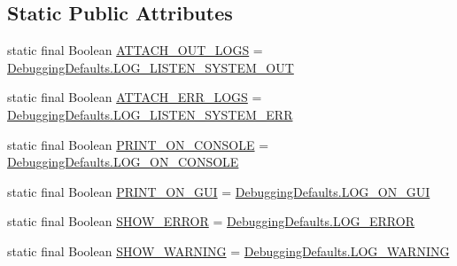 \subsection*{Static Public Attributes}
\begin{DoxyCompactItemize}
\item 
static final Boolean \hyperlink{classit_1_1emarolab_1_1cagg_1_1debugging_1_1StandaloneDebuggingText_a096b28d2f3e1c71e7f3d039559ea91a3}{A\-T\-T\-A\-C\-H\-\_\-\-O\-U\-T\-\_\-\-L\-O\-G\-S} = \hyperlink{classit_1_1emarolab_1_1cagg_1_1debugging_1_1DebuggingDefaults_a2d4710f38eb7e92c5b733f49baefd243}{Debugging\-Defaults.\-L\-O\-G\-\_\-\-L\-I\-S\-T\-E\-N\-\_\-\-S\-Y\-S\-T\-E\-M\-\_\-\-O\-U\-T}
\item 
static final Boolean \hyperlink{classit_1_1emarolab_1_1cagg_1_1debugging_1_1StandaloneDebuggingText_a3c7f740a83d97241fa0ec2964f466884}{A\-T\-T\-A\-C\-H\-\_\-\-E\-R\-R\-\_\-\-L\-O\-G\-S} = \hyperlink{classit_1_1emarolab_1_1cagg_1_1debugging_1_1DebuggingDefaults_a99a53b1245a543cd658a05b4559a8902}{Debugging\-Defaults.\-L\-O\-G\-\_\-\-L\-I\-S\-T\-E\-N\-\_\-\-S\-Y\-S\-T\-E\-M\-\_\-\-E\-R\-R}
\item 
static final Boolean \hyperlink{classit_1_1emarolab_1_1cagg_1_1debugging_1_1StandaloneDebuggingText_a5df7bc95dc452897fc12e474ac446f7b}{P\-R\-I\-N\-T\-\_\-\-O\-N\-\_\-\-C\-O\-N\-S\-O\-L\-E} = \hyperlink{classit_1_1emarolab_1_1cagg_1_1debugging_1_1DebuggingDefaults_a367caf2dc8777f38b40c160b848cafe0}{Debugging\-Defaults.\-L\-O\-G\-\_\-\-O\-N\-\_\-\-C\-O\-N\-S\-O\-L\-E}
\item 
static final Boolean \hyperlink{classit_1_1emarolab_1_1cagg_1_1debugging_1_1StandaloneDebuggingText_adacca5525ce59ace095bca4813d10b93}{P\-R\-I\-N\-T\-\_\-\-O\-N\-\_\-\-G\-U\-I} = \hyperlink{classit_1_1emarolab_1_1cagg_1_1debugging_1_1DebuggingDefaults_a82d4435a02f409eff194853e9ae63499}{Debugging\-Defaults.\-L\-O\-G\-\_\-\-O\-N\-\_\-\-G\-U\-I}
\item 
static final Boolean \hyperlink{classit_1_1emarolab_1_1cagg_1_1debugging_1_1StandaloneDebuggingText_a25b2f13f846a13ea2f8ec233645cec10}{S\-H\-O\-W\-\_\-\-E\-R\-R\-O\-R} = \hyperlink{classit_1_1emarolab_1_1cagg_1_1debugging_1_1DebuggingDefaults_acd5d57de60e84e4807ede35008bb3d6c}{Debugging\-Defaults.\-L\-O\-G\-\_\-\-E\-R\-R\-O\-R}
\item 
static final Boolean \hyperlink{classit_1_1emarolab_1_1cagg_1_1debugging_1_1StandaloneDebuggingText_a15ac1cd7df84553b0a7e1990469ea00b}{S\-H\-O\-W\-\_\-\-W\-A\-R\-N\-I\-N\-G} = \hyperlink{classit_1_1emarolab_1_1cagg_1_1debugging_1_1DebuggingDefaults_a609da8270808ac3bf908af33bd454c36}{Debugging\-Defaults.\-L\-O\-G\-\_\-\-W\-A\-R\-N\-I\-N\-G}

\end{DoxyCompactItemize}
